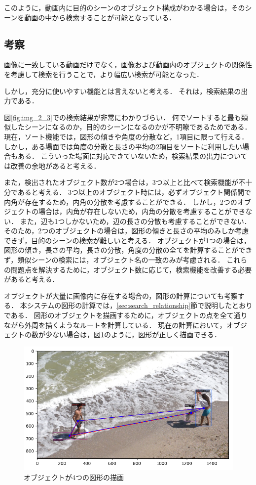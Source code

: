 \documentclass[a4j,12pt,dvipdfmx]{jreport}
\begin{document}
このように，動画内に目的のシーンのオブジェクト構成がわかる場合は，そのシーンを動画の中から検索することが可能となっている．

\subsection{考察}\label{chap4-3-1}
画像に一致している動画だけでなく，画像および動画内のオブジェクトの関係性を考慮して検索を行うことで，より幅広い検索が可能となった．

しかし，充分に使いやすい機能とは言えないと考える．
それは，検索結果の出力である．

図\ref{fig:img_2_3}での検索結果が非常にわかりづらい．
何でソートすると最も類似したシーンになるのか，目的のシーンになるのかが不明瞭であるためである．
現在，ソート機能では，図形の傾きや角度の分散など，1項目に限って行える．
しかし，ある場面では角度の分散と長さの平均の2項目をソートに利用したい場合もある．
こういった場面に対応できていないため，検索結果の出力については改善の余地があると考える．

また，検出されたオブジェクト数が2つ場合は，3つ以上と比べて検索機能が不十分であると考える．
3つ以上のオブジェクト時には，必ずオブジェクト関係間で内角が存在するため，内角の分散を考慮することができる．
しかし，2つのオブジェクトの場合は，内角が存在しないため，内角の分散を考慮することができない．
また，辺も1つしかないため，辺の長さの分散も考慮することができない．
そのため，2つのオブジェクトの場合は，図形の傾きと長さの平均のみしか考慮できず，目的のシーンの検索が難しいと考える．
オブジェクトが1つの場合は，図形の傾き，長さの平均，長さの分散，角度の分散の全てを計算することができず，類似シーンの検索には，オブジェクト名の一致のみが考慮される．
これらの問題点を解決するために，オブジェクト数に応じて，検索機能を改善する必要があると考える．

オブジェクトが大量に画像内に存在する場合の，図形の計算についても考察する．
本システムの図形の計算では，\ref{sec:search_relationship}節で説明したとおりである．
図形のオブジェクトを描画するために，オブジェクトの点を全て通りながら外周を描くようなルートを計算している．
現在の計算において，オブジェクトの数が少ない場合は，図\ref{fig:img_2_4_4}のように，図形が正しく描画できる．
\begin{figure}[b]
  \centering
  \includegraphics[width=13cm]{image/result_2_4_4.png}
  \caption{オブジェクトが4つの図形の描画}
  \label{fig:img_2_4_4}
\end{figure}
\end{document}
